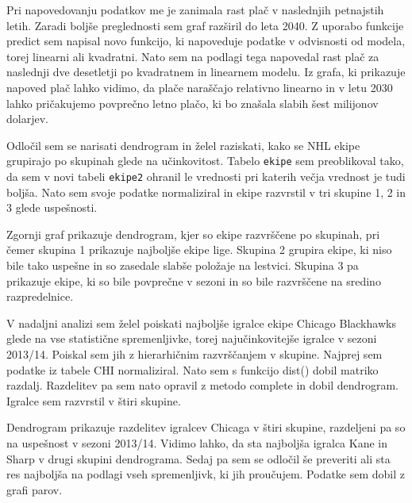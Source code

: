 \documentclass[11pt,a4paper]{article}
\begin{document}

Pri napovedovanju podatkov me je zanimala rast plač v naslednjih petnajstih letih. Zaradi boljše preglednosti sem graf razširil do leta 2040. Z uporabo funkcije predict sem napisal novo funkcijo, ki napoveduje podatke v odvisnosti od modela, torej linearni ali kvadratni. Nato sem na podlagi tega napovedal rast plač za naslednji dve desetletji po kvadratnem in linearnem modelu. Iz grafa, ki prikazuje napoved plač lahko vidimo, da plače naraščajo relativno linearno in v letu 2030 lahko pričakujemo povprečno letno plačo, ki bo znašala slabih šest milijonov dolarjev.

 
Odločil sem se narisati dendrogram in želel raziskati, kako se NHL ekipe grupirajo po skupinah glede na učinkovitost. Tabelo \verb|ekipe| sem preoblikoval tako, da sem v novi tabeli \verb|ekipe2| ohranil le vrednosti pri katerih večja vrednost je tudi boljša. Nato sem svoje podatke normaliziral in ekipe razvrstil v tri skupine 1, 2 in 3 glede uspešnosti.


Zgornji graf prikazuje dendrogram, kjer so ekipe razvrščene po skupinah, pri čemer skupina 1 prikazuje najboljše ekipe lige. Skupina 2 grupira ekipe, ki niso bile tako uspešne in so zasedale slabše položaje na lestvici. Skupina 3 pa prikazuje ekipe, ki so bile povprečne v sezoni in so bile razvrščene na sredino razpredelnice.

V nadaljni analizi sem želel poiskati najboljše igralce ekipe Chicago Blackhawks glede na vse statistične spremenljivke, torej najučinkovitejše igralce v sezoni 2013/14. Poiskal sem jih z hierarhičnim razvrščanjem v skupine. Najprej sem podatke iz tabele CHI normaliziral. Nato sem s funkcijo dist() dobil matriko razdalj. Razdelitev pa sem nato opravil z metodo complete in dobil dendrogram. Igralce sem razvrstil v štiri skupine.


Dendrogram prikazuje razdelitev igralcev Chicaga v štiri skupine, razdeljeni pa so na uspešnost v sezoni 2013/14. Vidimo lahko, da sta najboljša igralca Kane in Sharp v drugi skupini dendrograma. Sedaj pa sem se odločil še preveriti ali sta res najboljša na podlagi vseh spremenljivk, ki jih proučujem. Podatke sem dobil z grafi parov.
\end{document}
